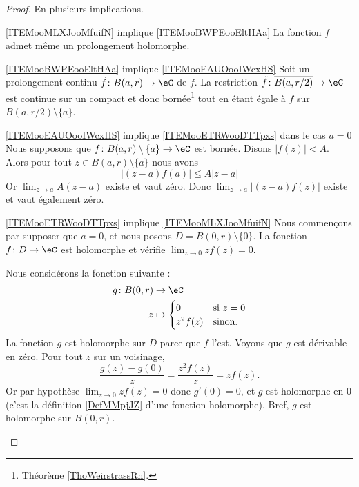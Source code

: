 \begin{proof}
	En plusieurs implications.
	\begin{subproof}
		\item[\ref{ITEMooMLXJooMfuifN} implique \ref{ITEMooBWPEooEltHAa}]
		La fonction \( f\) admet même un prolongement holomorphe.
		\item[\ref{ITEMooBWPEooEltHAa} implique \ref{ITEMooEAUOooIWcxHS}]
		Soit un prolongement continu \( \tilde f\colon B(a,r)\to \eC\) de \( f\). La restriction \( \tilde f\colon \overline{ B(a,r/2) }\to \eC\) est continue sur un compact et donc bornée\footnote{Théorème \ref{ThoWeirstrassRn}.} tout en étant égale à \( f\) sur \( B(a,r/2)\setminus\{ a \}\).
		\item[\ref{ITEMooEAUOooIWcxHS} implique \ref{ITEMooETRWooDTTpxs} dans le cas \( a=0\)]
		Nous supposons que \( f\colon B(a,r)\setminus\{ a \}\to \eC\) est bornée. Disons \( | f(z) |<A\). Alors pour tout \( z\in B(a,r)\setminus\{ a \}\) nous avons
		\begin{equation}
			| (z-a)f(a) |\leq A| z-a |
		\end{equation}
		Or $\lim_{z\to a}A(z-a)$ existe et vaut zéro. Donc \( \lim_{z\to a}| (z-a)f(z) |\) existe et vaut également zéro.
		\item[\ref{ITEMooETRWooDTTpxs} implique \ref{ITEMooMLXJooMfuifN}]
		Nous commençons par supposer que \( a=0\), et nous posons \( D=B(0,r)\setminus\{ 0 \}\). La fonction \( f\colon D\to \eC\) est holomorphe et vérifie \( \lim_{z\to 0}zf(z)=0\).

		Nous considérons la fonction suivante :
		\begin{equation}
			\begin{aligned}
				g\colon B(0,r) & \to \eC                            \\
				z              & \mapsto \begin{cases}
					0       & \text{si } z=0 \\
					z^2f(z) & \text{sinon. }
				\end{cases}
			\end{aligned}
		\end{equation}
		La fonction \( g\) est holomorphe sur \( D\) parce que \( f\) l'est. Voyons que \( g\) est dérivable en zéro. Pour tout \( z\) sur un voisinage,
		\begin{equation}
			\frac{ g(z)-g(0) }{ z }=\frac{ z^2f(z) }{ z }=zf(z).
		\end{equation}
		Or par hypothèse \( \lim_{z\to 0}zf(z)=0\) donc \( g'(0)=0\), et \( g\) est holomorphe en \( 0\) (c'est la définition \ref{DefMMpjJZ} d'une fonction holomorphe). Bref, \( g\) est holomorphe sur \( B(0,r)\).


\end{subproof}
\end{proof}
